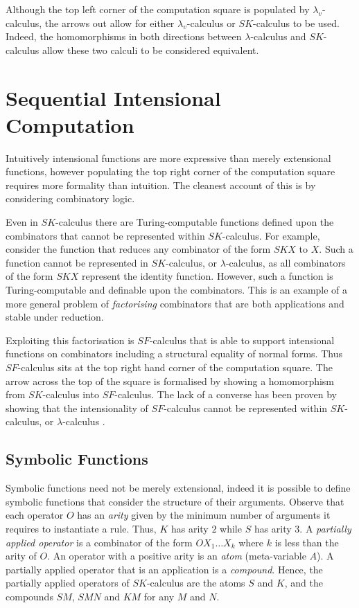 \documentclass{llncs}
\begin{document}
Although the top left corner of the computation square is populated by $\lambda_v$-calculus, the arrows out allow for either $\lambda_v$-calculus or $SK$-calculus to be used.
Indeed, the homomorphisms in both directions between $\lambda$-calculus and $SK$-calculus allow these two calculi to be considered equivalent.


\section{Sequential Intensional Computation}
\label{sec:sic}

Intuitively intensional functions are more expressive than merely extensional functions,
however populating the top right corner of the computation square requires more formality than intuition.
The cleanest account of this is by considering combinatory logic.

Even in $SK$-calculus there are Turing-computable functions defined upon the combinators that cannot be represented within $SK$-calculus.
For example, consider the function that reduces any combinator of the form $SKX$ to $X$.
Such a function cannot be represented in $SK$-calculus, or $\lambda$-calculus, as all combinators of the form $SKX$ represent the identity function. However, such a function is Turing-computable and definable upon the combinators.
This is an example of a more general problem of {\em factorising} combinators that are both applications and stable under reduction.

Exploiting this factorisation is $SF$-calculus \cite{JayGW11} that is able to support intensional functions on combinators including a structural equality of normal forms.
Thus $SF$-calculus sits at the top right hand corner of the computation square.
The arrow across the top of the square is formalised by showing a homomorphism from $SK$-calculus into $SF$-calculus. The lack of a converse has been proven by showing that the intensionality of $SF$-calculus cannot be represented within $SK$-calculus, or $\lambda$-calculus \cite{JayGW11}.

\subsection{Symbolic Functions}
\label{sec:SF-sym}

Symbolic functions need not be merely extensional, indeed it is possible to define symbolic functions that consider the structure of their arguments.
Observe that each operator $O$ has an {\em arity} given by the minimum number of arguments it requires to
instantiate a rule. Thus, $K$ has arity $2$ while $S$ has arity $3$. A
{\em partially applied operator} is a combinator of the form
$OX_1\ldots X_k$ where $k$ is less than the arity of $O$.  An operator
with a positive arity is an {\em atom} (meta-variable $A$).  A
partially applied operator that is an application is a {\em compound}.
Hence, the partially applied operators of $SK$-calculus are the atoms
$S$ and $K$, and the compounds $SM$, $SMN$ and $KM$ for any $M$ and
$N$.
\end{document}

